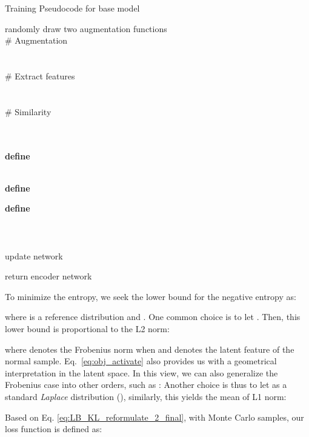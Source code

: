 \documentclass[journal]{IEEEtran}
\theoremstyle{remark}
\begin{document}
\begin{algorithm}
  \caption{Training Pseudocode for base model}
  \label{alg::Training Pseudocode base model}  
  {
        {
            randomly draw two augmentation functions \\
            \# Augmentation\\
            \\
            \\
            \# Extract features\\
            \\
            \\
        }
        {   
            \# Similarity\\
            \\
             \\
        }
        
        \textbf{define} 
        
        \\
        \textbf{define} 
        
        \textbf{define} \\
        \\
        \\
        \\
        update network 
    }
    return encoder network  
\end{algorithm}



To minimize the entropy, we seek the lower bound for the negative entropy as:
 
where  is a reference distribution and . One common choice is to let . Then, this lower bound is proportional to the L2 norm:

where  denotes the Frobenius norm when  and  denotes the latent feature of the  normal sample. Eq.~\ref{eq:obj_activate} also provides us with a geometrical interpretation in the latent space. In this view, we can also generalize the Frobenius case into other orders, such as : Another choice is thus to let  as a standard \textit{Laplace} distribution (), similarly, this yields the mean of L1 norm:

Based on Eq. \ref{eq:LB_KL_reformulate_2_final}, with Monte Carlo samples, our loss function is defined as:
\end{document}
